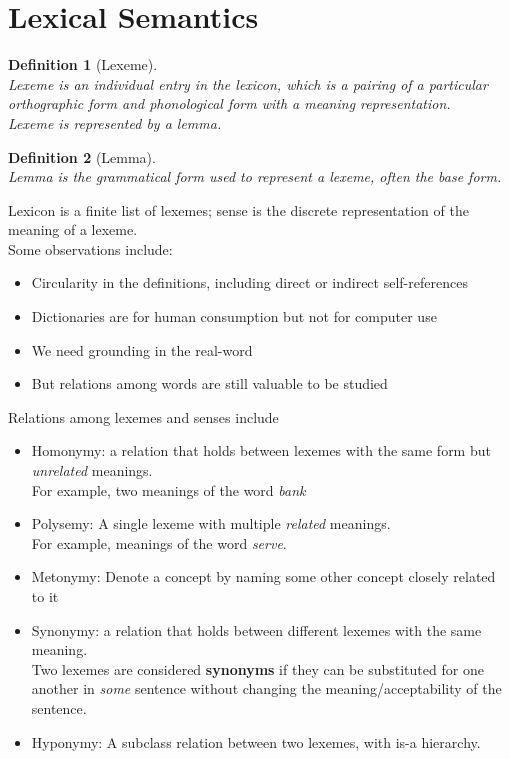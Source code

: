 \documentclass[12pt]{article}
\newtheorem{definition}{Definition}[section]
\theoremstyle{definition}
\begin{document}
\section{Lexical Semantics}
\begin{definition}[Lexeme]
\hfill\\\normalfont Lexeme is an individual entry in the lexicon, which is a pairing of a particular orthographic form and phonological form with a meaning representation.\\
Lexeme is represented by a lemma.
\end{definition}
\begin{definition}[Lemma]
\hfill\\\normalfont Lemma is the grammatical form used to represent a lexeme, often the base form.
\end{definition}
Lexicon is a finite list of lexemes; sense is the discrete representation of the meaning of a lexeme.\\
Some observations include:
\begin{itemize}
	\item Circularity in the definitions, including direct or indirect self-references
	\item Dictionaries are for human consumption but not for computer use
	\item We need grounding in the real-word
	\item But relations among words are still valuable to be studied
\end{itemize}
Relations among lexemes and senses include
\begin{itemize}
	\item Homonymy: a relation that holds between lexemes with the same form but \textit{unrelated} meanings. \\For example, two meanings of the word \textit{bank}
	\item Polysemy: A single lexeme with multiple \textit{related} meanings. \\For example, meanings of the word \textit{serve}.
	\item Metonymy: Denote a concept by naming some other concept closely related to it
	\item Synonymy: a relation that holds between different lexemes with the same meaning.\\
	Two lexemes are considered \textbf{synonyms} if they can be substituted for one another in \textit{some} sentence without changing the meaning/acceptability of the sentence.
	\item Hyponymy: A subclass relation between two lexemes, with is-a hierarchy.
\end{itemize}
\end{document}
